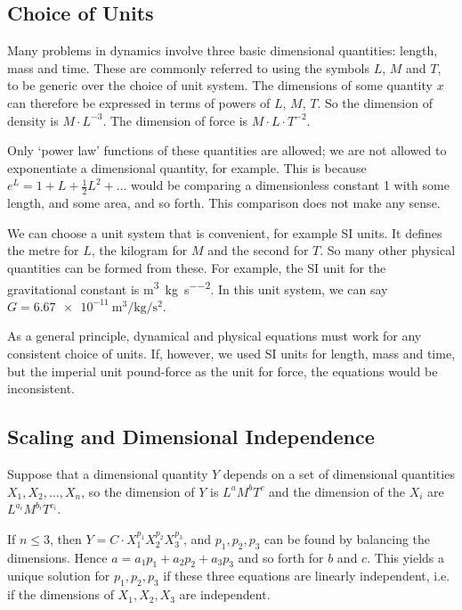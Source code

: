 \documentclass{article}
\begin{document}
\subsection{Choice of Units}
Many problems in dynamics involve three basic dimensional quantities: length, mass and time. These are commonly referred to using the symbols $L$, $M$ and $T$, to be generic over the choice of unit system. The dimensions of some quantity $x$ can therefore be expressed in terms of powers of $L$, $M$, $T$. So the dimension of density is $M \cdot L^{-3}$. The dimension of force is $M \cdot L \cdot T^{-2}$.

Only `power law' functions of these quantities are allowed; we are not allowed to exponentiate a dimensional quantity, for example. This is because $e^L = 1 + L + \frac{1}{2}L^2 + \dots$ would be comparing a dimensionless constant 1 with some length, and some area, and so forth. This comparison does not make any sense.

We can choose a unit system that is convenient, for example SI units. It defines the metre for $L$, the kilogram for $M$ and the second for $T$. So many other physical quantities can be formed from these. For example, the SI unit for the gravitational constant is \si{\metre\cubed\per\kilogram\per\second\squared}. In this unit system, we can say $G = \SI{6.67e-11}{\metre\cubed\per\kilogram\per\second\squared}$.

As a general principle, dynamical and physical equations must work for any consistent choice of units. If, however, we used SI units for length, mass and time, but the imperial unit pound-force as the unit for force, the equations would be inconsistent.

\subsection{Scaling and Dimensional Independence}
Suppose that a dimensional quantity $Y$ depends on a set of dimensional quantities $X_1, X_2, \dots, X_n$, so the dimension of $Y$ is $L^a M^b T^c$ and the dimension of the $X_i$ are $L^{a_i} M^{b_i} T^{c_i}$.

If $n \leq 3$, then $Y = C \cdot X_1^{p_1}X_2^{p_2}X_3^{p_3}$, and $p_1, p_2, p_3$ can be found by balancing the dimensions. Hence $a = a_1p_1 + a_2p_2 + a_3p_3$ and so forth for $b$ and $c$. This yields a unique solution for $p_1, p_2, p_3$ if these three equations are linearly independent, i.e. if the dimensions of $X_1, X_2, X_3$ are independent.
\end{document}
